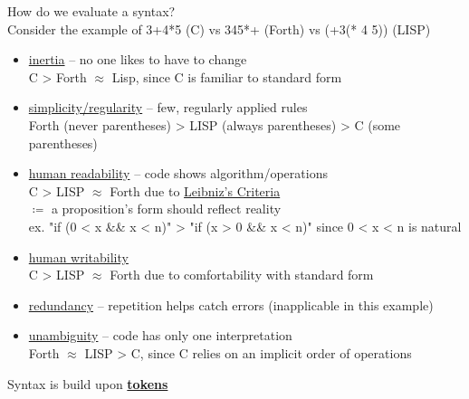 \documentclass[../../lecture_notes.tex]{subfiles}
\begin{document}
\noindent How do we evaluate a syntax?  \\
Consider the example of 3+4*5 (C) vs 345*+ (Forth) vs (+3(* 4 5)) (LISP)
\begin{itemize} [itemsep=0mm]
	\item \underline{inertia} -- no one likes to have to change\\
		C > Forth $\approx$ Lisp, since C is familiar to standard form
	\item \underline{simplicity/regularity} -- few, regularly applied rules\\
		Forth (never parentheses) > LISP (always parentheses) > C (some parentheses)
	\item \underline{human readability} -- code shows algorithm/operations\\
		C > LISP $\approx$ Forth due to \underline{Leibniz's Criteria} \\
		$\coloneqq$ a proposition's form should reflect reality\\
				ex. "if (0 < x \&\& x < n)" > "if (x > 0 \&\& x < n)" since 0 < x < n is natural
	\item \underline{human writability}\\
		C  > LISP $\approx$ Forth due to comfortability with standard form
	\item \underline{redundancy} -- repetition helps catch errors (inapplicable in this example)
	\item \underline{unambiguity} -- code has only one interpretation\\
		Forth $\approx$ LISP > C, since C relies on an implicit order of operations
\end{itemize}
Syntax is build upon \textbf{\underline{tokens}}
\end{document}
